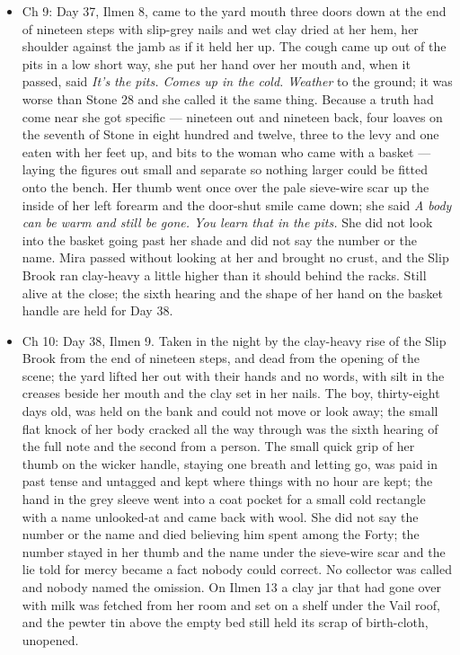 \documentclass{design/chronicle}
\begin{document}
{\begin{itemize}[leftmargin=1.4em,itemsep=1pt,topsep=3pt,parsep=0pt]
\item Ch 9: Day 37, Ilmen 8, came to the yard mouth three doors down at the end of nineteen steps with slip-grey nails and wet clay dried at her hem, her shoulder against the jamb as if it held her up. The cough came up out of the pits in a low short way, she put her hand over her mouth and, when it passed, said \emph{It’s the pits. Comes up in the cold. Weather} to the ground; it was worse than Stone 28 and she called it the same thing. Because a truth had come near she got specific --- nineteen out and nineteen back, four loaves on the seventh of Stone in eight hundred and twelve, three to the levy and one eaten with her feet up, and bits to the woman who came with a basket --- laying the figures out small and separate so nothing larger could be fitted onto the bench. Her thumb went once over the pale sieve-wire scar up the inside of her left forearm and the door-shut smile came down; she said \emph{A body can be warm and still be gone. You learn that in the pits.} She did not look into the basket going past her shade and did not say the number or the name. Mira passed without looking at her and brought no crust, and the Slip Brook ran clay-heavy a little higher than it should behind the racks. Still alive at the close; the sixth hearing and the shape of her hand on the basket handle are held for Day 38.

\end{itemize}

\begin{itemize}[leftmargin=1.4em,itemsep=1pt,topsep=3pt,parsep=0pt]

\item Ch 10: Day 38, Ilmen 9. Taken in the night by the clay-heavy rise of the Slip Brook from the end of nineteen steps, and dead from the opening of the scene; the yard lifted her out with their hands and no words, with silt in the creases beside her mouth and the clay set in her nails. The boy, thirty-eight days old, was held on the bank and could not move or look away; the small flat knock of her body cracked all the way through was the sixth hearing of the full note and the second from a person. The small quick grip of her thumb on the wicker handle, staying one breath and letting go, was paid in past tense and untagged and kept where things with no hour are kept; the hand in the grey sleeve went into a coat pocket for a small cold rectangle with a name unlooked-at and came back with wool. She did not say the number or the name and died believing him spent among the Forty; the number stayed in her thumb and the name under the sieve-wire scar and the lie told for mercy became a fact nobody could correct. No collector was called and nobody named the omission. On Ilmen 13 a clay jar that had gone over with milk was fetched from her room and set on a shelf under the Vail roof, and the pewter tin above the empty bed still held its scrap of birth-cloth, unopened.

\end{itemize}
}
\end{document}
